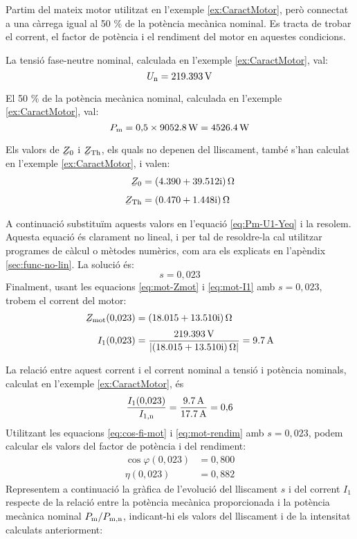 \begin{exemple}\label{ex:MotCarregaReduida}
	\addcontentsxms{\MotCarregaReduida}
	Partim del mateix motor utilitzat en l'exemple \vref{ex:CaractMotor}, però connectat a una càrrega igual  al 50 \% de la potència mecànica nominal. Es tracta de trobar el corrent, el factor de potència i el rendiment del motor en aquestes condicions.

	La tensió  fase-neutre  nominal, calculada  en l'exemple \ref{ex:CaractMotor}, val: 
	\[
		U_\mathrm{n} = \qty{219,393}{V}
	\]
	
	El 50 \% de la potència mecànica nominal, calculada  en l'exemple \ref{ex:CaractMotor}, val:
	\[
		P_\mathrm{m} =  0{,}5\times\qty{9052,8}{W} = \qty{4526,4}{W}
	\]

	Els valors de $\cmplx{Z}_0$ i  $\cmplx{Z}\ped{Th}$, els quals no depenen del lliscament, també s'han calculat en  l'exemple \ref{ex:CaractMotor}, i valen:
	\begin{align*}
		\cmplx{Z}_0 &=  \complexqty{4,390+j39,512}{\ohm} \\[1ex]
		\cmplx{Z}\ped{Th} &= \complexqty{0,470+j1,448}{\ohm} 
	\end{align*}
	
	A continuació  substituïm aquests valors en l'equació \eqref{eq:Pm-U1-Yeq} i la resolem.  Aquesta equació és clarament no lineal, i per tal de resoldre-la cal utilitzar programes de càlcul o mètodes numèrics, com ara els explicats en l'apèndix \ref{sec:func-no-lin}. La solució és:
	\[
		s = 0{,}023
	\]
	Finalment, usant les equacions \eqref{eq:mot-Zmot} i \eqref{eq:mot-I1} amb $s  = 0{,}023$,  trobem el corrent del motor:
	\begin{align*}
	\cmplx{Z}\ped{mot}(0{,}023) &=  \complexqty{18,015+j13,510}{\ohm} \\[0.5ex]
	I_1(0{,}023) &= \frac{\qty{219,393}{V}}{|\complexqty{18,015+j13,510}{\ohm}|} = \qty{9,7}{A}
	\end{align*}
	
	La relació entre aquest  corrent i el corrent nominal a tensió i potència nominals, calculat en l'exemple \ref{ex:CaractMotor}, és
	\[
	\frac{I_1(0{,}023)}{I_\mathrm{1,n}} = \frac{\qty{9,7}{A}}{\qty{17,7}{A}} = 0{,}6
	\]
	Utilitzant les equacions  \eqref{eq:cos-fi-mot} i \eqref{eq:mot-rendim} amb $s  = 0{,}023$, podem calcular els valors del factor de potència i del rendiment:
	\begin{align*}
		\cos\varphi(0{,}023) &=  0{,}800 \\
		\eta(0{,}023) &=  0{,}882
	\end{align*}	
	Representem a continuació la gràfica de l'evolució del lliscament $s$ i del corrent $I_1$ respecte de la relació entre la potència mecànica proporcionada i la potència mecànica nominal $P_\mathrm{m}/P_\mathrm{m,n}$, indicant-hi els valors del lliscament i de la intensitat calculats anteriorment:
	\begin{center}
		
	\end{center}


\end{exemple}
